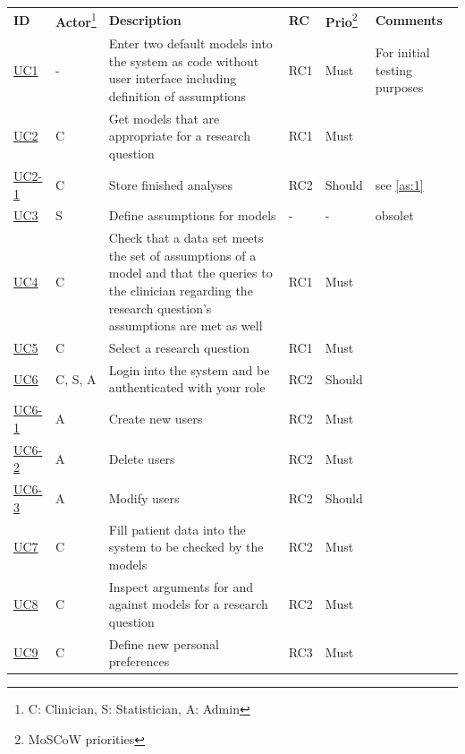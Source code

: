 \begin{landscape}
	\begin{longtable}{ l l p{11cm} l l p{3cm} }
		\textbf{ID}                         & \textbf{\Gls{Actor}}\footnote{C: Clinician, S: Statistician, A: Admin} &\textbf{Description} &  \textbf{RC} & \textbf{Prio}\footnote{MoSCoW priorities} &  \textbf{Comments}\\
		\href{https://trello.com/c/KEOokZp9}{UC1}   & 	- & 	Enter two default models into the system as code without user interface including definition of assumptions & RC1 & Must &  For initial testing purposes  \\
		\href{https://trello.com/c/ebVrFdA5}{UC2}   & 	C & 	Get models that are appropriate for a research question & RC1	& Must &	   \\
		\href{https://trello.com/c/ORRBjISQ}{UC2-1} & 	C & 	Store finished analyses & RC2 & Should &  see \autoref{as:1} \\
		\href{https://trello.com/c/qKLAoWRj}{UC3} 	&  	S & 	Define assumptions for models & - & - & obsolet \\
		\href{https://trello.com/c/7NINsfz8}{UC4}   & 	C & 	Check that a data set meets the set of assumptions of a model and that the queries to the clinician regarding the research question's  assumptions are met as well & RC1 & Must   &   \\
		\href{https://trello.com/c/22JGne3r}{UC5}   & 	C & 	Select a research question & RC1 & Must &   \\
		\href{https://trello.com/c/CVGBVWID}{UC6}   &   C, S, A & 	Login into the system and be authenticated with your role & RC2 & Should &	 \\
		\href{https://trello.com/c/pId27kJM}{UC6-1} &   A & 	Create new users & RC2 & Must &	 \\
		\href{https://trello.com/c/pQ98qgSL}{UC6-2} &  	A & 	Delete users & RC2 & Must	 &   \\
		\href{https://trello.com/c/mvxBeNSR}{UC6-3} &  	A & 	Modify users & RC2 & Should &   \\
		\href{https://trello.com/c/DidVQKAS}{UC7}   &   C & 	Fill patient data into the system to be checked by the models & RC2 & Must &  \\
		\href{https://trello.com/c/be2088JH}{UC8}	& 	C & 	Inspect arguments for and against models for a research question & RC2 & Must &   \\
		\href{https://trello.com/c/Ca9mA3uA}{UC9}   &   C & 	Define new personal preferences & RC3 & Must &   \\

\end{longtable}
\end{landscape}

